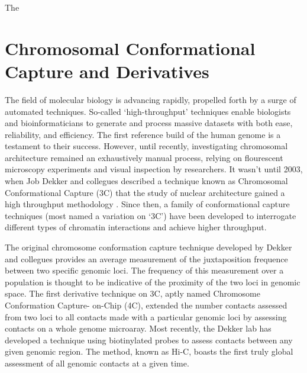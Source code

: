 \documentclass[phd,tocprelim]{cornell}
\begin{document}
The




\chapter{Chromosomal Conformational Capture and Derivatives}

The field of molecular biology is advancing rapidly, propelled forth by a
surge of automated techniques.  So-called `high-throughput' techniques enable
biologists and bioinformaticians to generate and process massive datasets with
both ease, reliability, and efficiency.  The first reference build of the
human genome is a testament to their success\cite{hgsc2004}.  However,
until recently, investigating chromosomal architecture remained an
exhaustively manual process, relying on flourescent microscopy experiments and
visual inspection by researchers.  It wasn't until 2003, when Job Dekker and
collegues described a technique known as Chromosomal Conformational Capture
(3C) that the study of nuclear architecture gained a high throughput methodology
\cite{dekker2002}. Since then, a family of conformational capture techniques
(most named a variation on `3C') have been developed to interrogate
different types of chromatin interactions and achieve higher throughput.

The original chromosome conformation capture technique developed by Dekker and
collegues provides an average measurement of the juxtaposition frequence between
two specific genomic loci\cite{frase2014}.  The frequency of this measurement over a population
is thought to be indicative of the proximity of the two loci in genomic space.
The first derivative technique on 3C, aptly named Chromosome Conformation Capture-
on-Chip (4C), extended the number contacts assessed from two loci to all
contacts made with a particular genomic loci by assessing contacts on a
whole genome microaray\cite{simonis2006}.  Most recently, the Dekker lab has
developed a technique using biotinylated probes to assess contacts between any
given genomic region\cite{berkum2010}.  The method, known as Hi-C, boasts
the first truly global assessment of all genomic contacts at a given time.
\end{document}
